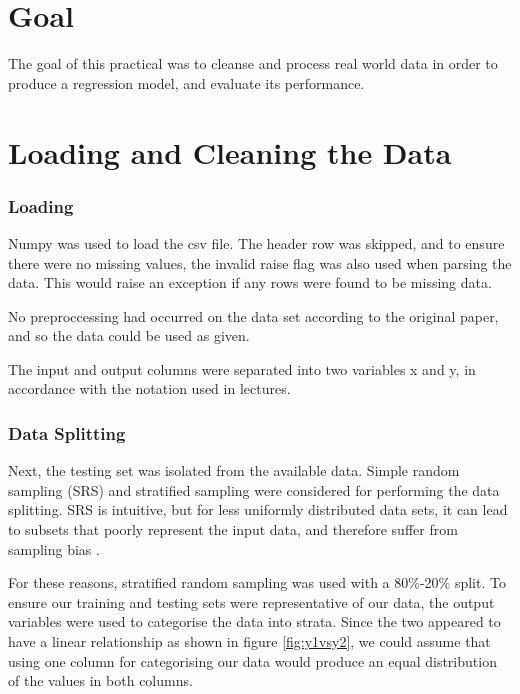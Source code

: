 \documentclass[12pt]{article}
\begin{document}

\part*{Goal}

The goal of this practical was to cleanse and process real world data in order to produce a regression model, and evaluate its performance.

\tableofcontents

\pagebreak

\setcounter{page}{1}

\part{Loading and Cleaning the Data}

\section{Loading}
Numpy was used to load the csv file. The header row was skipped, and to ensure there were no missing values, the invalid raise flag was also used when parsing the data. This would raise an exception if any rows were found to be missing data. 

No preproccessing had occurred on the data set according to the original paper, and so the data could be used as given.

The input and output columns were separated into two variables x and y, in accordance with the notation used in lectures.

\section{Data Splitting}

Next, the testing set was isolated from the available data. Simple random sampling (SRS) and stratified sampling were considered for performing the data splitting. SRS is intuitive, but for less uniformly distributed data sets, it can lead to subsets that poorly represent the input data, and therefore suffer from sampling bias \cite{reitermanova_2010}. 

For these reasons, stratified random sampling was used with a 80\%-20\% split.  To ensure our training and testing sets were representative of our data, the output variables were used to categorise the data into strata. Since the two appeared to have a linear relationship as shown in figure \ref{fig:y1vsy2}, we could assume that using one column for categorising our data would produce an equal distribution of the values in both columns.
\end{document}
